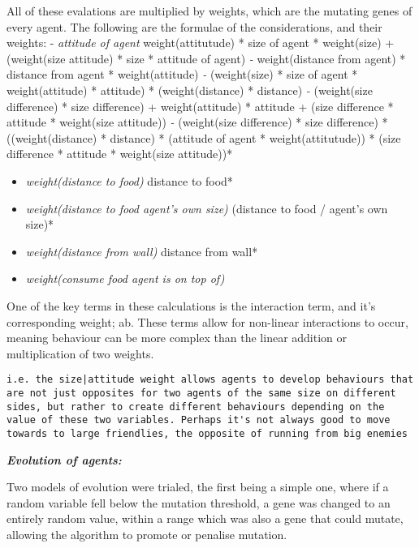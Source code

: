 \documentclass[
]{article}
\begin{document}
All of these evalations are multiplied by weights, which are the
mutating genes of every agent. The following are the formulae of the
considerations, and their weights: - \emph{attitude of agent }
weight(attitutude) * size of agent * weight(size) + (weight(size
\textbar{} attitude) * size * attitude of agent)\emph{ -
}weight(distance from agent) * distance from agent *
weight(attitude)\emph{ - }(weight(size) * size of agent *
weight(attitude) * attitude) * (weight(distance) * distance)\emph{ -
}(weight(size difference) * size difference) + weight(attitude) *
attitude + (size difference * attitude * weight(size \textbar{}
attitude))\emph{ - }(weight(size difference) * size difference) *
((weight(distance) * distance) * (attitude of agent *
weight(attitutude)) * (size difference * attitude * weight(size
\textbar{} attitude))*

\begin{itemize}
\item
  \emph{weight(distance to food) } distance to food*
\item
  \emph{weight(distance to food \textbar{} agent's own size) } (distance
  to food / agent's own size)*
\item
  \emph{weight(distance from wall) } distance from wall*
\item
  \emph{weight(consume food agent is on top of)}
\end{itemize}

One of the key terms in these calculations is the interaction term, and
it's corresponding weight; a\textbar b. These terms allow for non-linear
interactions to occur, meaning behaviour can be more complex than the
linear addition or multiplication of two weights.

\begin{verbatim}
i.e. the size|attitude weight allows agents to develop behaviours that are not just opposites for two agents of the same size on different sides, but rather to create different behaviours depending on the value of these two variables. Perhaps it's not always good to move towards to large friendlies, the opposite of running from big enemies
\end{verbatim}

\textbf{\emph{Evolution of agents:}}

Two models of evolution were trialed, the first being a simple one,
where if a random variable fell below the mutation threshold, a gene was
changed to an entirely random value, within a range which was also a
gene that could mutate, allowing the algorithm to promote or penalise
mutation.
\end{document}
